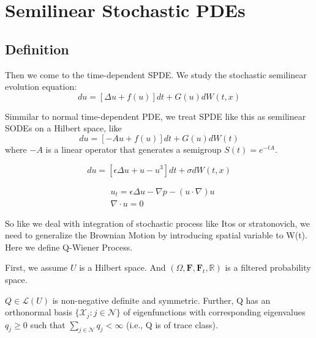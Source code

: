 \section{Semilinear Stochastic PDEs}
\subsection{Definition}
Then we come to the time-dependent SPDE. We study the stochastic semilinear evolution equation:
\begin{equation}
    du = [\Delta u + f(u)]dt + G(u)dW(t, x)
\end{equation}
\begin{definition}
    Simmilar to normal time-dependent PDE, we treat SPDE like this as semilinear SODEs on a Hilbert space, like
\begin{equation}
    du = [-Au+f(u)]dt + G(u)dW(t)
\end{equation}
where $-A$ is a linear operator that generates a semigroup $S(t)=e^{-tA}$. 
\end{definition}

\begin{example}
\begin{equation}
    du = [\epsilon \Delta u + u - u^3]dt + \sigma dW(t, x)
\end{equation}
\end{example}

\begin{example}
    \begin{equation}
        \begin{aligned}
            &u_t = \epsilon \Delta u - \nabla p - (u\cdot \nabla)u\\
            &\nabla\cdot u = 0
        \end{aligned}
    \end{equation}
\end{example}


So like we deal with integration of stochastic process like Itos or stratonovich, we need to generalize the Brownian Motion by introducing spatial variable to W(t). 
Here we define Q-Wiener Process. 

First, we assume $U$ is a Hilbert space. And $(\Omega, \mathbf{F}, \mathbf{F}_t, \mathbb{R})$ is a filtered probability space. 
\begin{definition}[Q]\label{Q}
    $Q \in \mathcal{L}(U)$ is non-negative definite and symmetric. 
    Further, Q has an orthonormal basis $\{ \mathcal{X}_j : j \in \mathcal{N}\}$ of eigenfunctions with corresponding eigenvalues $q_j \geq 0$  such that $\sum_{j\in\mathcal{N}} q_j < \infty$ (i.e., Q is of trace class).
\end{definition}

